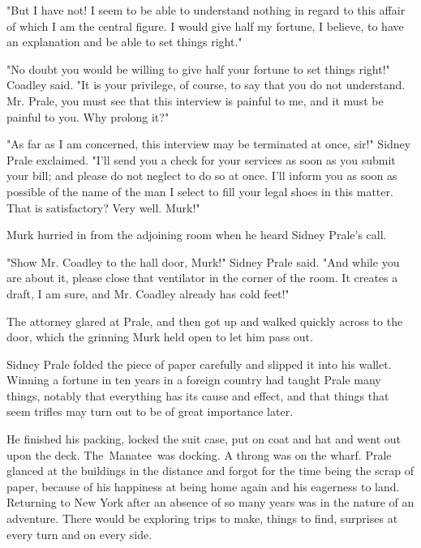 \documentclass{novel}
\begin{document}
"But I have not! I seem to be able to understand nothing in regard to this affair of which I am the central figure. I would give half my fortune, I believe, to have an explanation and be able to set things right."

"No doubt you would be willing to give half your fortune to set things right!" Coadley said. "It is your privilege, of course, to say that you do not understand. Mr. Prale, you must see that this interview is painful to me, and it must be painful to you. Why prolong it?"

"As far as I am concerned, this interview may be terminated at once, sir!" Sidney Prale exclaimed. "I'll send you a check for your services as soon as you submit your bill; and please do not neglect to do so at once. I'll inform you as soon as possible of the name of the man I select to fill your legal shoes in this matter. That is satisfactory? Very well. Murk!"

Murk hurried in from the adjoining room when he heard Sidney Prale's call.

"Show Mr. Coadley to the hall door, Murk!" Sidney Prale said. "And while you are about it, please close that ventilator in the corner of the room. It creates a draft, I am sure, and Mr. Coadley already has cold feet!"

The attorney glared at Prale, and then got up and walked quickly across to the door, which the grinning Murk held open to let him pass out.

\vspace{2\nbs}
\clearpage
\thispagestyle{empty}

\begin{ChapterStart}
\vspace{3\nbs}
\end{ChapterStart}
    
Sidney Prale folded the piece of paper carefully and slipped it into his wallet. Winning a fortune in ten years in a foreign country had taught Prale many things, notably that everything has its cause and effect, and that things that seem trifles may turn out to be of great importance later.

He finished his packing, locked the suit case, put on coat and hat and went out upon the deck. The Manatee was docking. A throng was on the wharf. Prale glanced at the buildings in the distance and forgot for the time being the scrap of paper, because of his happiness at being home again and his eagerness to land. Returning to New York after an absence of so many years was in the nature of an adventure. There would be exploring trips to make, things to find, surprises at every turn and on every side.
\end{document}
